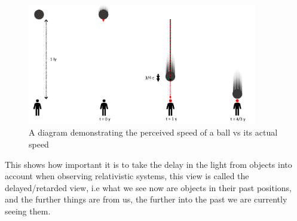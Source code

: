 \begin{figure}[H]
	\centering
	\includegraphics[width=10cm]{images/pdf/Perceived_speed.pdf}
	\caption{A diagram demonstrating the perceived speed of a ball vs its actual speed}
	\label{fig: perceived vs actual speed}
\end{figure}

This shows how important it is to take the delay in the light from objects into account when observing relativistic systems, this view is called the delayed/retarded view, i.e what we see now are objects in their past positions, and the further things are from us, the further into the past we are currently seeing them.







